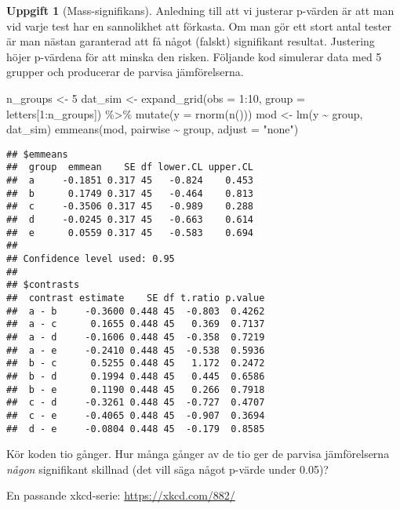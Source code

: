\documentclass[
]{book}
\newenvironment{Shaded}{\begin{snugshade}}{\end{snugshade}}
\newcommand{\AttributeTok}[1]{\textcolor[rgb]{0.77,0.63,0.00}{#1}}
\newcommand{\DecValTok}[1]{\textcolor[rgb]{0.00,0.00,0.81}{#1}}
\newcommand{\FunctionTok}[1]{\textcolor[rgb]{0.00,0.00,0.00}{#1}}
\newcommand{\NormalTok}[1]{#1}
\newcommand{\OtherTok}[1]{\textcolor[rgb]{0.56,0.35,0.01}{#1}}
\newcommand{\SpecialCharTok}[1]{\textcolor[rgb]{0.00,0.00,0.00}{#1}}
\newcommand{\StringTok}[1]{\textcolor[rgb]{0.31,0.60,0.02}{#1}}
\theoremstyle{definition}
\theoremstyle{definition}
\theoremstyle{definition}
\newtheorem{exercise}{Uppgift}[chapter]
\theoremstyle{definition}
\theoremstyle{remark}
\begin{document}
\begin{exercise}[Mass-signifikans]
Anledning till att vi justerar p-värden är att man vid varje test har en sannolikhet att förkasta. Om man gör ett stort antal tester är man nästan garanterad att få något (falskt) signifikant resultat. Justering höjer p-värdena för att minska den risken. Följande kod simulerar data med 5 grupper och producerar de parvisa jämförelserna.

\begin{Shaded}
\begin{Highlighting}[]
\NormalTok{n\_groups }\OtherTok{\textless{}{-}} \DecValTok{5}
\NormalTok{dat\_sim }\OtherTok{\textless{}{-}} \FunctionTok{expand\_grid}\NormalTok{(}\AttributeTok{obs =} \DecValTok{1}\SpecialCharTok{:}\DecValTok{10}\NormalTok{, }\AttributeTok{group =}\NormalTok{ letters[}\DecValTok{1}\SpecialCharTok{:}\NormalTok{n\_groups]) }\SpecialCharTok{\%\textgreater{}\%} \FunctionTok{mutate}\NormalTok{(}\AttributeTok{y =} \FunctionTok{rnorm}\NormalTok{(}\FunctionTok{n}\NormalTok{()))}
\NormalTok{mod }\OtherTok{\textless{}{-}} \FunctionTok{lm}\NormalTok{(y }\SpecialCharTok{\textasciitilde{}}\NormalTok{ group, dat\_sim)}
\FunctionTok{emmeans}\NormalTok{(mod, pairwise }\SpecialCharTok{\textasciitilde{}}\NormalTok{ group, }\AttributeTok{adjust =} \StringTok{"none"}\NormalTok{)}
\end{Highlighting}
\end{Shaded}

\begin{verbatim}
## $emmeans
##  group  emmean    SE df lower.CL upper.CL
##  a     -0.1851 0.317 45   -0.824    0.453
##  b      0.1749 0.317 45   -0.464    0.813
##  c     -0.3506 0.317 45   -0.989    0.288
##  d     -0.0245 0.317 45   -0.663    0.614
##  e      0.0559 0.317 45   -0.583    0.694
## 
## Confidence level used: 0.95 
## 
## $contrasts
##  contrast estimate    SE df t.ratio p.value
##  a - b     -0.3600 0.448 45  -0.803  0.4262
##  a - c      0.1655 0.448 45   0.369  0.7137
##  a - d     -0.1606 0.448 45  -0.358  0.7219
##  a - e     -0.2410 0.448 45  -0.538  0.5936
##  b - c      0.5255 0.448 45   1.172  0.2472
##  b - d      0.1994 0.448 45   0.445  0.6586
##  b - e      0.1190 0.448 45   0.266  0.7918
##  c - d     -0.3261 0.448 45  -0.727  0.4707
##  c - e     -0.4065 0.448 45  -0.907  0.3694
##  d - e     -0.0804 0.448 45  -0.179  0.8585
\end{verbatim}

Kör koden tio gånger. Hur många gånger av de tio ger de parvisa jämförelserna \emph{någon} signifikant skillnad (det vill säga något p-värde under 0.05)?

En passande xkcd-serie: \url{https://xkcd.com/882/}
\end{exercise}
\end{document}
